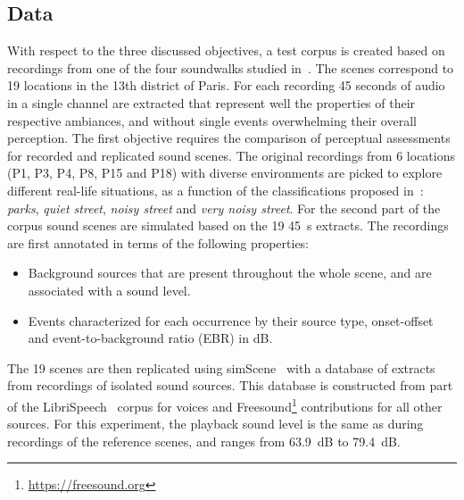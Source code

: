 \documentclass[11pt,a4paper]{article}
\begin{document}
\subsection{Data}
\label{sec:test_data}

With respect to the three discussed objectives, a test corpus is created based on recordings from one of the four soundwalks studied in~\cite{aumond2017}. The scenes correspond to 19 locations in the 13th district of Paris. For each recording 45 seconds of audio in a single channel are extracted that represent well the properties of their respective ambiances, and without single events overwhelming their overall perception.
The first objective requires the comparison of perceptual assessments for recorded and replicated sound scenes. The original recordings from 6 locations (P1, P3, P4, P8, P15 and P18) with diverse environments are picked to explore different real-life situations, as a function of the classifications proposed in~\cite{gloaguen2017}: \textit{parks}, \textit{quiet street}, \textit{noisy street} and \textit{very noisy street}. For the second part of the corpus sound scenes are simulated based on the 19 45~s extracts. The recordings are first annotated in terms of the following properties:

\begin{itemize}
\item Background sources that are present throughout the whole scene, and are associated with a sound level.
\item Events characterized for each occurrence by their source type, onset-offset and event-to-background ratio (EBR) in dB.
\end{itemize}

The 19 scenes are then replicated using simScene~\cite{rossignol2015} with a database of extracts from recordings of isolated sound sources. This database is constructed from part of the LibriSpeech~\cite{panayotov2015} corpus for voices and Freesound\footnote{\url{https://freesound.org}} contributions for all other sources. For this experiment, the playback sound level is the same as during recordings of the reference scenes, and ranges from 63.9~dB to 79.4~dB.\\
\end{document}
